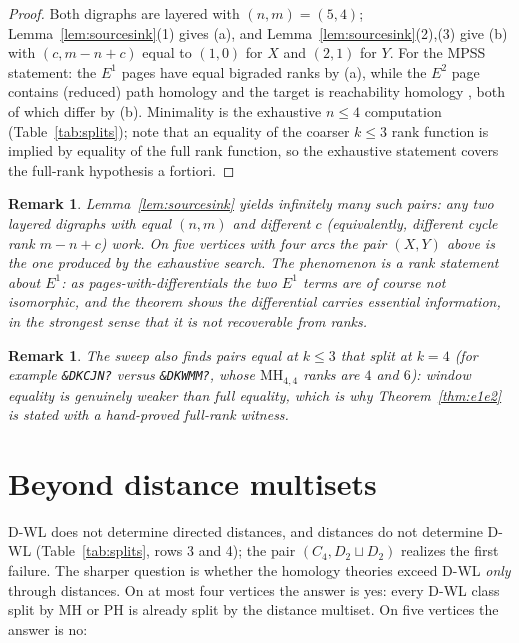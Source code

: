 \documentclass[pdflatex,sn-mathphys,Numbered]{sn-jnl}
\theoremstyle{thmstyleone}
\theoremstyle{thmstyletwo}
\newtheorem{remark}[theorem]{Remark}
\newcommand{\MH}{\mathrm{MH}}
\newcommand{\PH}{\mathrm{PH}}
\begin{document}
\begin{proof}
Both digraphs are layered with $(n, m) = (5, 4)$;
Lemma~\ref{lem:sourcesink}(1) gives (a), and
Lemma~\ref{lem:sourcesink}(2),(3) give (b) with $(c, m{-}n{+}c)$ equal to
$(1, 0)$ for $X$ and $(2, 1)$ for $Y$. For the MPSS statement: the $E^1$
pages have equal bigraded ranks by (a), while the $E^2$ page contains
(reduced) path homology \cite{Asao23,HepworthRoff24} and the target is
reachability homology \cite{HepworthRoffIMRN}, both of which differ by
(b). Minimality is the exhaustive $n \le 4$ computation
(Table~\ref{tab:splits}); note that an equality of the coarser $k \le 3$
rank function is implied by equality of the full rank function, so the
exhaustive statement covers the full-rank hypothesis a fortiori.
\end{proof}

\begin{remark}
Lemma~\ref{lem:sourcesink} yields infinitely many such pairs: any two
layered digraphs with equal $(n, m)$ and different $c$ (equivalently,
different cycle rank $m - n + c$) work. On five vertices with four arcs
the pair $(X, Y)$ above is the one produced by the exhaustive search. The
phenomenon is a rank statement about $E^1$: as pages-with-differentials
the two $E^1$ terms are of course not isomorphic, and the theorem shows
the differential carries essential information, in the strongest sense
that it is not recoverable from ranks.
\end{remark}

\begin{remark}\label{rem:truncation}
The sweep also finds pairs equal at $k \le 3$ that split at $k = 4$
(for example \texttt{\&DKCJN?} versus \texttt{\&DKWMM?}, whose $\MH_{4,4}$
ranks are $4$ and $6$): window equality is genuinely weaker than full
equality, which is why Theorem~\ref{thm:e1e2} is stated with a
hand-proved full-rank witness.
\end{remark}

\section{Beyond distance multisets}\label{sec:beyonddist}

D-WL does not determine directed distances, and distances do not
determine D-WL (Table~\ref{tab:splits}, rows 3 and 4); the pair
$(C_4, D_2 \sqcup D_2)$ realizes the first failure. The sharper question
is whether the homology theories exceed D-WL \emph{only} through
distances. On at most four vertices the answer is yes: every D-WL class
split by $\MH$ or $\PH$ is already split by the distance multiset. On
five vertices the answer is no:
\end{document}

